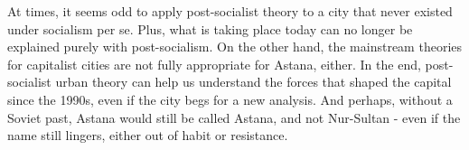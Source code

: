 \documentclass{article}
\begin{document}
At times, it seems odd to apply post-socialist theory to a city that never existed under socialism per se. Plus, what is taking place today can no longer be explained purely with post-socialism. On the other hand, the mainstream theories for capitalist cities are not fully appropriate for Astana, either. In the end, post-socialist urban theory can help us understand the forces that shaped the capital since the 1990s, even if the city begs for a new analysis.
And perhaps, without a Soviet past, Astana would still be called Astana, and not Nur-Sultan - even if the name still lingers, either out of habit or resistance.

\pagebreak

\printbibliography
\end{document}
